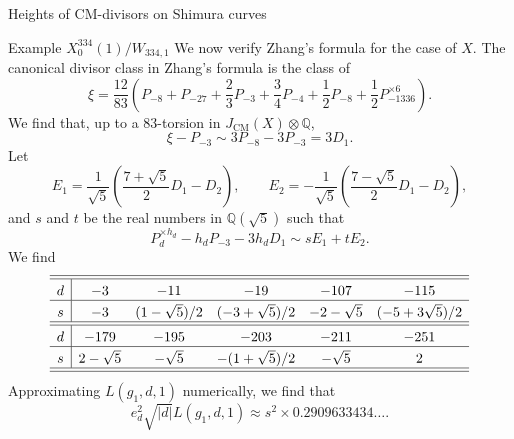 \documentclass{amsart}
\newcounter{lemma}
\theoremstyle{definition}
\newtheorem{Remark}[lemma]{Remark}
\def\Q{\mathbb Q}
\def\CM{\mathrm{CM}}
\begin{document}
\begin{section}{Heights of CM-divisors on Shimura curves}
\begin{subsection}{Example $X_0^{334}(1)/W_{334,1}$}
We now verify Zhang's formula for the case of $X$.
The canonical divisor class in Zhang's formula is the class of
$$
  \xi=\frac{12}{83}\left(P_{-8}+P_{-27}+\frac23P_{-3}+\frac34P_{-4}
  +\frac12P_{-8}+\frac12P_{-1336}^{\times 6}\right).
$$
We find that, up to a $83$-torsion in $J_\CM(X)\otimes\Q$,
$$
  \xi-P_{-3}\sim 3P_{-8}-3P_{-3}=3D_1.
$$
Let
$$
  E_1=\frac1{\sqrt5}\left(\frac{7+\sqrt5}2D_1-D_2\right), \qquad
  E_2=-\frac1{\sqrt5}\left(\frac{7-\sqrt5}2D_1-D_2\right),
$$
and $s$ and $t$ be the real numbers in $\Q(\sqrt5)$ such that
$$
  P_d^{\times h_d}-h_dP_{-3}-3h_dD_1\sim sE_1+tE_2.
$$
We find
$$ \extrarowheight3pt
\begin{array}{c|cccccc} \hline\hline
 d & -3 & -11 & -19 & -107 & -115 \\ \hline
 s & -3 & (1-\sqrt5)/2 & (-3+\sqrt5)/2 & -2-\sqrt 5 & (-5+3\sqrt5)/2 
\\ \hline\hline
 d & -179 & -195 & -203 & -211 & -251 \\ \hline
 s & 2-\sqrt5 & -\sqrt5 & -(1+\sqrt5)/2 & -\sqrt5 & 2 \\ \hline\hline
\end{array}
$$
Approximating $L(g_1,d,1)$ numerically, we find that
$$
  e_d^2\sqrt{|d|}L(g_1,d,1)\approx s^2\times 0.2909633434\ldots.
$$
\end{subsection}
\end{section}
\end{document}

